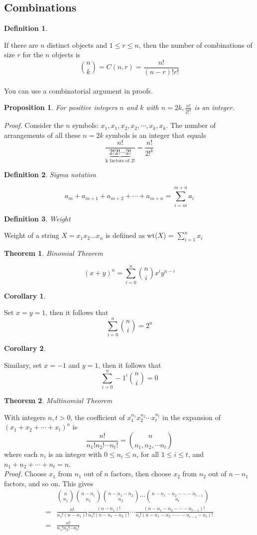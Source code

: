 \documentclass[12pt]{article}
\newtheorem{definition}{Definition} [section]
\newtheorem{proposition}{Proposition} [subsection]
\newtheorem{theorem}{Theorem} [section]
\newtheorem{corollary}{Corollary} [theorem]
\begin{document}
\subsection{Combinations}
\begin{definition}\end{definition} \noindent If there are $n$ distinct objects and $ 1 \leq r \leq n $, then the number of combinations of size $r$ for the $n$ objects is
\[
\binom{n}{k}=C(n, r) = \frac{n!}{(n-r)!r!}
\]
\\
You can use a combinatorial argument in proofs.
\begin{proposition} For positive integers $n$ and $k$ with $n=2k, \frac{n!}{2!^k}$ is an integer. \end{proposition}
\emph{Proof.}  Consider the $n$ symbols: $x_1, x_1, x_2, x_2, \cdots, x_k, x_k$.
The number of arrangements of all these $n = 2k$ symbols is an integer that equals
\[
\frac{n!}{\underbrace{2! 2! \cdots 2!}_{\text{k factors of 2!}}} = \frac{n!}{2!^k}
\]
\begin{definition}Sigma notation\end{definition}
\[
a_m + a_{m+1} + a_{m+2} + \cdots + a_{m+n} = \sum_{i = m}^{m+n} a_i
\]
\begin{definition}Weight\end{definition}
Weight of a string $X = x_1 x_2 \dots x_n$ is defiined as wt($X$) = $\sum_{i=1}^n x_i$
\begin{theorem}Binomial Theorem\end{theorem}
\[
(x+y)^n = \sum_{i=0}^{n} \binom{n}{i} x^i y^{n-i}
\]
\begin{corollary}\end{corollary} Set $x=y=1$, then it follows that 
\[
\sum_{i=0}^n \binom{n}{i} = 2^n
\]
\begin{corollary}\end{corollary} Similary, set $x = -1$ and $y = 1$, then it follows that 
\[
\sum_{i=0}^n -1^i \binom{n}{i} = 0
\]
\begin{theorem}Multinomial Theorem\end{theorem} With integers $n, t > 0$, the coefficient of $ x_1^{n_1}x_2^{n_2}\cdots x_t^{n_t}$ in the expansion of $(x_1 + x_2 + \cdots + x_t)^n$ is
\[
\frac{n!}{n_1!n_2! \cdots n_t!} = \binom{n}{n_1, n_2, \cdots n_t}
\]
where each $n_i$ is an integer with $0 \leq n_i \leq n$, for all $1 \leq i \leq t$, and $n_1 + n_2 + \cdots + n_t = n$.\\

\emph{Proof.} Choose $x_1$ from $n_1$ out of $n$ factors, then choose $x_2$ from $n_2$ out of $n - n_1$ factors, and so on. This gives 
\begin{eqnarray*}
& \displaystyle \binom{n}{n_1} \binom{n-n_1}{n_2} \binom{n-n_1-n_2}{n_3} \cdots \binom{n-n_1-n_2- \cdots - n_{t-1}}{n_t} \\
= & \displaystyle \frac{n!}{n_1!(n-n_1)!} \frac{(n-n_1)!}{n_2!(n-n_1-n_2)!} \cdots \frac{(n-n_1-n_2- \cdots - n_{t-1})!}{n_t!(n-n_1-n_2- \cdots - n_{t-1}-n_t)!} \\
= & \displaystyle \frac{n!}{n_1!n_2! \cdots n_t!}
\end{eqnarray*}
\end{document}
